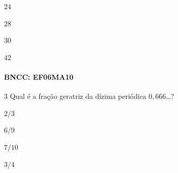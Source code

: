 \begin{escolha}
\item $24$
\item $28$
\item $30$
\item $42$
\end{escolha}

\paragraph{BNCC: EF06MA10 }


\num{3} Qual é a fração geratriz da dízima periódica $0,666$\ldots?

\begin{escolha}
\item $2/3$
\item $6$/9
\item $7/10$
\item $3/4$
\end{escolha}



